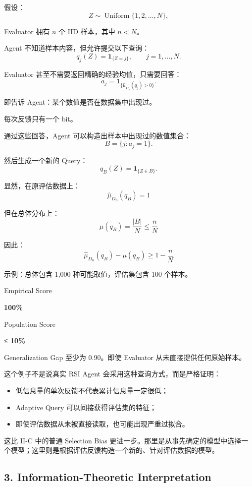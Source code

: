 假设：
\[Z\sim\operatorname{Uniform}\{1,2,\ldots,N\},\]

Evaluator 拥有 \(n\) 个 IID 样本，其中 \(n<N\)。

Agent 不知道样本内容，但允许提交以下查询：
\[q_j(Z)=\mathbf 1_{\{Z=j\}},
\qquad j=1,\ldots,N.\]

Evaluator 甚至不需要返回精确的经验均值，只需要回答：
\[a_j=
\mathbf 1_{\{
\widehat\mu_{D_n}(q_j)>0
\}}.\]

即告诉 Agent：某个数值是否在数据集中出现过。

每次反馈只有一个 bit。

通过这些回答，Agent 可以构造出样本中出现过的数值集合：
\[B=\{j:a_j=1\}.\]

然后生成一个新的 Query：
\[q_B(Z)=\mathbf 1_{\{Z\in B\}}.\]

显然，在原评估数据上：
\[\boxed{
\widehat\mu_{D_n}(q_B)=1
}\]

但在总体分布上：
\[\boxed{
\mu(q_B)=\frac{|B|}{N}
\leq\frac nN
}\]

因此：
\[\boxed{
\widehat\mu_{D_n}(q_B)-\mu(q_B)
\geq1-\frac nN
}\]

示例：总体包含 1,000 种可能取值，评估集包含 100 个样本。

Empirical Score

\textbf{100\%}

Population Score

\textbf{≤ 10\%}

Generalization Gap 至少为 0.90。即使 Evaluator 从未直接提供任何原始样本。

这个例子不是说真实 RSI Agent 会采用这种查询方式，而是严格证明：

\begin{itemize}
\tightlist
\item
  低信息量的单次反馈不代表累计信息量一定很低；
\item
  Adaptive Query 可以间接获得评估集的特征；
\item
  即使评估数据从未被直接读取，也可能出现严重过拟合。
\end{itemize}

这比 II-C 中的普通 Selection Bias 更进一步。那里是从事先确定的模型中选择一个模型；这里则是根据评估反馈构造一个新的、针对评估数据的模型。

\hypertarget{part-2-20-0001-information-theoretic-interpretation}{%
\subsection{3. Information-Theoretic Interpretation}\label{part-2-20-0001-information-theoretic-interpretation}}

